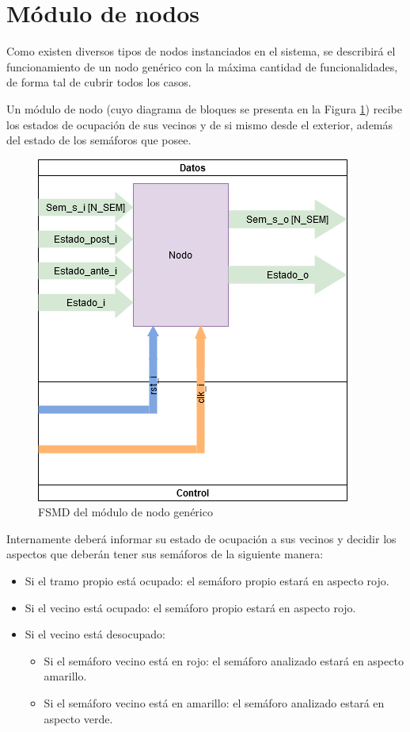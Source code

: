 \section{Módulo de nodos}

	Como existen diversos tipos de nodos instanciados en el sistema, se describirá el funcionamiento de un nodo genérico con la máxima cantidad de funcionalidades, de forma tal de cubrir todos los casos.
	
	Un módulo de nodo (cuyo diagrama de bloques se presenta en la Figura \ref{fig:FSMD_Nodo}) recibe los estados de ocupación de sus vecinos y de si mismo desde el exterior, además del estado de los semáforos que posee. 
	
	\begin{figure}[h]
	\centering
	\includegraphics[scale=.5]{./Figures/FSMD-Nodo}
		\caption{FSMD del módulo de nodo genérico}
		\label{fig:FSMD_Nodo}
	\end{figure}		
	
	Internamente deberá informar su estado de ocupación a sus vecinos y decidir los aspectos que deberán tener sus semáforos de la siguiente manera:
			
	\begin{itemize}
		\item Si el tramo propio está ocupado: el semáforo propio estará en aspecto rojo.
		\item Si el vecino está ocupado: el semáforo propio estará en aspecto rojo.
		\item Si el vecino está desocupado:
		\begin{itemize}
			\item Si el semáforo vecino está en rojo: el semáforo analizado estará en aspecto amarillo.
			\item Si el semáforo vecino está en amarillo:  el semáforo analizado estará en aspecto verde.
		\end{itemize}				 
	\end{itemize}
	
